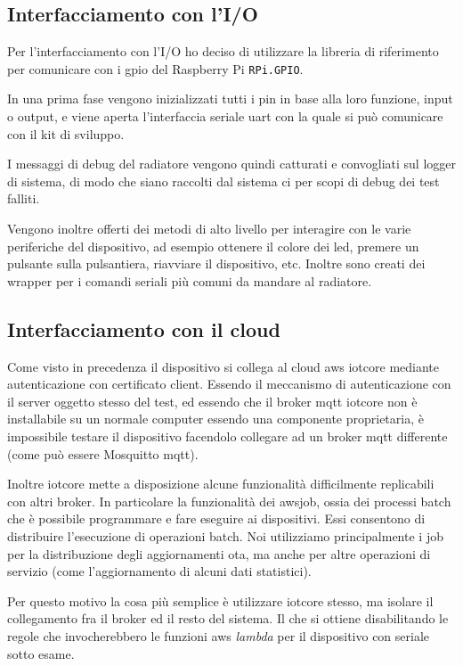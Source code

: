 \documentclass[12pt,a4paper,twoside,titlepage]{book}
\begin{document}
\subsection{Interfacciamento con l'I/O}

Per l'interfacciamento con l'I/O ho deciso di utilizzare la libreria di riferimento
per comunicare con i \Gls{gpio} del Raspberry Pi \texttt{RPi.GPIO}.

In una prima fase vengono inizializzati tutti i pin in base alla loro funzione, input
o output, e viene aperta l'interfaccia seriale \acrshort{uart} con la quale si può comunicare con
il kit di sviluppo.

I messaggi di debug del radiatore vengono quindi catturati e convogliati sul logger
di sistema, di modo che siano raccolti dal sistema \acrfull{ci} per scopi di debug 
dei test falliti.

Vengono inoltre offerti dei metodi di alto livello per interagire con le varie
periferiche del dispositivo, ad esempio ottenere il colore dei led, premere un
pulsante sulla pulsantiera, riavviare il dispositivo, etc.
Inoltre sono creati dei wrapper per i comandi seriali più comuni da mandare al
radiatore.

\subsection{Interfacciamento con il cloud}

Come visto in precedenza il dispositivo si collega al cloud \acrshort{aws} \Gls{iotcore} mediante
autenticazione con certificato client. Essendo il meccanismo di autenticazione con il
server oggetto stesso del test, ed essendo che il \gls{broker} \acrshort{mqtt} \Gls{iotcore} non è installabile
su un normale computer essendo una componente proprietaria, è impossibile testare il
dispositivo facendolo collegare ad un \gls{broker} \Gls{mqtt} differente (come può essere Mosquitto \Gls{mqtt}).

Inoltre \Gls{iotcore} mette a disposizione alcune funzionalità difficilmente replicabili con
altri \gls{broker}. In particolare la funzionalità dei \Gls{awsjob}, ossia dei processi batch che è
possibile programmare e fare eseguire ai dispositivi. Essi consentono di distribuire l'esecuzione
di operazioni batch. Noi utilizziamo principalmente i job per la distribuzione degli aggiornamenti \acrshort{ota},
ma anche per altre operazioni di servizio (come l'aggiornamento di alcuni dati statistici).

Per questo motivo la cosa più semplice è utilizzare \Gls{iotcore} stesso, ma isolare il collegamento
fra il \gls{broker} ed il resto del sistema. Il che si ottiene disabilitando le regole che invocherebbero 
le funzioni \acrshort{aws} \textit{lambda} per il dispositivo con seriale sotto esame. 
\end{document}
